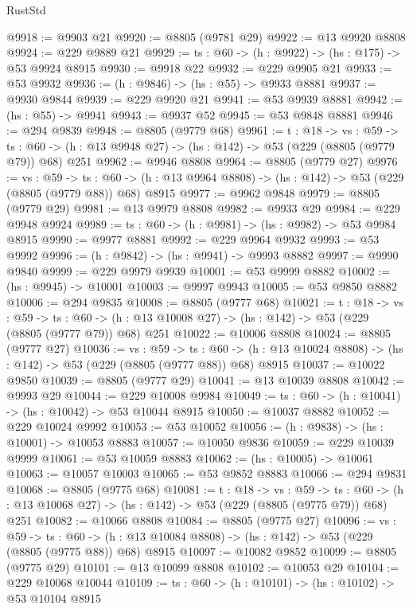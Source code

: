 \begin{lexlean}{RustStd}
\begin{coremodule}
@9918 := @9903 @21
@9920 := @8805 (@9781 @29)
@9922 := @13 @9920 @8808
@9924 := @229 @9889 @21
@9929 := {ts : @60} -> (h : @9922) -> (hs : @175) -> @53 @9924 @8915
@9930 := @9918 @22
@9932 := @229 @9905 @21
@9933 := @53 @9932
@9936 := (h : @9846) -> (hs : @55) -> @9933 @8881
@9937 := @9930 @9844
@9939 := @229 @9920 @21
@9941 := @53 @9939 @8881
@9942 := (hs : @55) -> @9941
@9943 := @9937 @52
@9945 := @53 @9848 @8881
@9946 := @294 @9839
@9948 := @8805 (@9779 @68)
@9961 := {t : @18} ->
  {vs : @59} ->
  {ts : @60} -> (h : @13 @9948 @27) -> (hs : @142) -> @53 (@229 (@8805 (@9779 @79)) @68) @251
@9962 := @9946 @8808
@9964 := @8805 (@9779 @27)
@9976 := {vs : @59} ->
  {ts : @60} -> (h : @13 @9964 @8808) -> (hs : @142) -> @53 (@229 (@8805 (@9779 @88)) @68) @8915
@9977 := @9962 @9848
@9979 := @8805 (@9779 @29)
@9981 := @13 @9979 @8808
@9982 := @9933 @29
@9984 := @229 @9948 @9924
@9989 := {ts : @60} -> (h : @9981) -> (hs : @9982) -> @53 @9984 @8915
@9990 := @9977 @8881
@9992 := @229 @9964 @9932
@9993 := @53 @9992
@9996 := (h : @9842) -> (hs : @9941) -> @9993 @8882
@9997 := @9990 @9840
@9999 := @229 @9979 @9939
@10001 := @53 @9999 @8882
@10002 := (hs : @9945) -> @10001
@10003 := @9997 @9943
@10005 := @53 @9850 @8882
@10006 := @294 @9835
@10008 := @8805 (@9777 @68)
@10021 := {t : @18} ->
  {vs : @59} ->
  {ts : @60} -> (h : @13 @10008 @27) -> (hs : @142) -> @53 (@229 (@8805 (@9777 @79)) @68) @251
@10022 := @10006 @8808
@10024 := @8805 (@9777 @27)
@10036 := {vs : @59} ->
  {ts : @60} -> (h : @13 @10024 @8808) -> (hs : @142) -> @53 (@229 (@8805 (@9777 @88)) @68) @8915
@10037 := @10022 @9850
@10039 := @8805 (@9777 @29)
@10041 := @13 @10039 @8808
@10042 := @9993 @29
@10044 := @229 @10008 @9984
@10049 := {ts : @60} -> (h : @10041) -> (hs : @10042) -> @53 @10044 @8915
@10050 := @10037 @8882
@10052 := @229 @10024 @9992
@10053 := @53 @10052
@10056 := (h : @9838) -> (hs : @10001) -> @10053 @8883
@10057 := @10050 @9836
@10059 := @229 @10039 @9999
@10061 := @53 @10059 @8883
@10062 := (hs : @10005) -> @10061
@10063 := @10057 @10003
@10065 := @53 @9852 @8883
@10066 := @294 @9831
@10068 := @8805 (@9775 @68)
@10081 := {t : @18} ->
  {vs : @59} ->
  {ts : @60} -> (h : @13 @10068 @27) -> (hs : @142) -> @53 (@229 (@8805 (@9775 @79)) @68) @251
@10082 := @10066 @8808
@10084 := @8805 (@9775 @27)
@10096 := {vs : @59} ->
  {ts : @60} -> (h : @13 @10084 @8808) -> (hs : @142) -> @53 (@229 (@8805 (@9775 @88)) @68) @8915
@10097 := @10082 @9852
@10099 := @8805 (@9775 @29)
@10101 := @13 @10099 @8808
@10102 := @10053 @29
@10104 := @229 @10068 @10044
@10109 := {ts : @60} -> (h : @10101) -> (hs : @10102) -> @53 @10104 @8915

\end{coremodule}
\end{lexlean}
